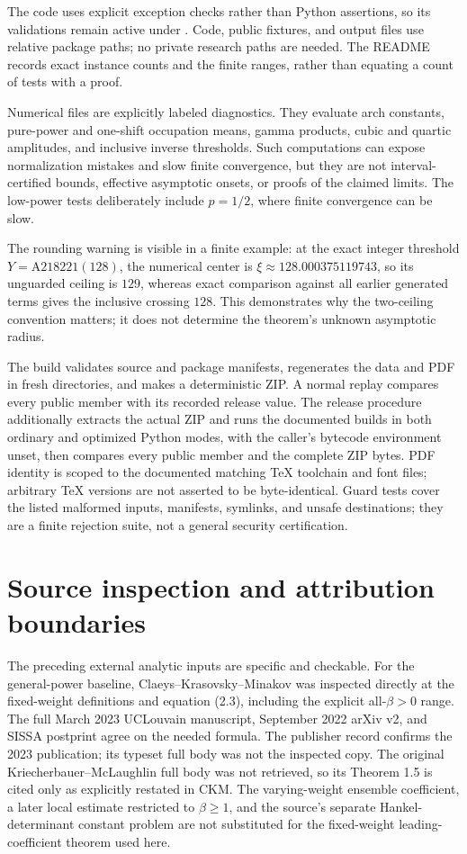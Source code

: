 \documentclass[11pt,letterpaper]{article}
\numberwithin{equation}{section}
\theoremstyle{remark}\newtheorem{remark}[theorem]{Remark}
\newcommand{\code}[1]{\texttt{\detokenize{#1}}}
\begin{document}
The code uses explicit exception checks rather than Python assertions, so its validations remain active under \code{python -O}. Code, public fixtures, and output files use relative package paths; no private research paths are needed. The README records exact instance counts and the finite ranges, rather than equating a count of tests with a proof.

Numerical files are explicitly labeled diagnostics. They evaluate arch constants, pure-power and one-shift occupation means, gamma products, cubic and quartic amplitudes, and inclusive inverse thresholds. Such computations can expose normalization mistakes and slow finite convergence, but they are not interval-certified bounds, effective asymptotic onsets, or proofs of the claimed limits. The low-power tests deliberately include $p=1/2$, where finite convergence can be slow.

The rounding warning is visible in a finite example: at the exact integer threshold $Y=\mathrm{A218221}(128)$, the numerical center is $\xi\approx128.000375119743$, so its unguarded ceiling is $129$, whereas exact comparison against all earlier generated terms gives the inclusive crossing $128$. This demonstrates why the two-ceiling convention matters; it does not determine the theorem's unknown asymptotic radius.

The build validates source and package manifests, regenerates the data and PDF in fresh directories, and makes a deterministic ZIP. A normal replay compares every public member with its recorded release value. The release procedure additionally extracts the actual ZIP and runs the documented builds in both ordinary and optimized Python modes, with the caller's bytecode environment unset, then compares every public member and the complete ZIP bytes. PDF identity is scoped to the documented matching TeX toolchain and font files; arbitrary TeX versions are not asserted to be byte-identical. Guard tests cover the listed malformed inputs, manifests, symlinks, and unsafe destinations; they are a finite rejection suite, not a general security certification.

\section{Source inspection and attribution boundaries}\label{pwd:hm:sec:sources}
The preceding external analytic inputs are specific and checkable. For the general-power baseline, Claeys--Krasovsky--Minakov \cite{ckm} was inspected directly at the fixed-weight definitions and equation (2.3), including the explicit all-$\beta>0$ range. The full March 2023 UCLouvain manuscript, September 2022 arXiv v2, and SISSA postprint agree on the needed formula. The publisher record confirms the 2023 publication; its typeset full body was not the inspected copy. The original Kriecherbauer--McLaughlin full body was not retrieved, so its Theorem 1.5 is cited only as explicitly restated in CKM. The varying-weight ensemble coefficient, a later local estimate restricted to $\beta\ge1$, and the source's separate Hankel-determinant constant problem are not substituted for the fixed-weight leading-coefficient theorem used here.
\end{document}
